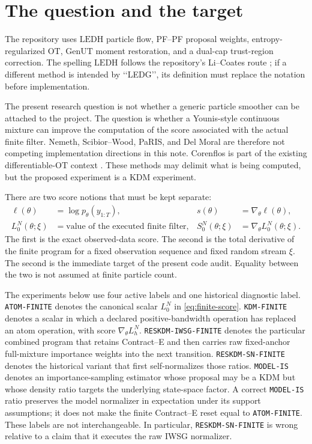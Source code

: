 \documentclass[11pt]{article}
\newcommand{\LEDH}{\ensuremath{\mathrm{LEDH}}}
\newcommand{\GenUT}{\ensuremath{\mathrm{GenUT}}}
\newcommand{\OT}{\ensuremath{\mathrm{OT}}}
\begin{document}
\section{The question and the target}

The repository uses \LEDH{} particle flow, PF--PF proposal weights,
entropy-regularized \OT{}, \GenUT{} moment restoration, and a dual-cap
trust-region correction.  The spelling \LEDH{} follows the repository's
Li--Coates route \citep{li2017particle}; if a different method is intended by
\lq\lq LEDG\rq\rq, its definition must replace the notation before
implementation.

The present research question is not whether a generic particle smoother can
be attached to the project.  The question is whether a Younis-style
continuous mixture can improve the computation of the score associated with
the actual finite filter.  Nemeth, Scibior--Wood, PaRIS, and Del Moral are
therefore not competing implementation directions in this note.  Corenflos
is part of the existing differentiable-\OT{} context
\citep{corenflos2021differentiable}.  These methods may delimit what is being
computed, but the proposed experiment is a KDM experiment.

There are two score notions that must be kept separate:
\begin{align}
  \ell(\theta) &= \log p_\theta(y_{1:T}), &
  s(\theta) &= \nabla_\theta \ell(\theta), \label{eq:exact-score}\\
  L_0^N(\theta;\xi) &= \text{value of the executed finite filter}, &
  S_0^N(\theta;\xi) &= \nabla_\theta L_0^N(\theta;\xi). \label{eq:finite-score}
\end{align}
The first is the exact observed-data score.  The second is the total
derivative of the finite program for a fixed observation sequence and fixed
random stream $\xi$.  The second is the immediate target of the present code
audit.  Equality between the two is not assumed at finite particle count.

The experiments below use four active labels and one historical diagnostic
label.  \texttt{ATOM-FINITE} denotes the
canonical scalar $L_0^N$ in \eqref{eq:finite-score}.  \texttt{KDM-FINITE}
denotes a scalar in which a declared positive-bandwidth operation has replaced
an atom operation, with score $\nabla_\theta L_h^N$.
\texttt{RESKDM-IWSG-FINITE} denotes the particular combined program that
retains Contract--E and then carries raw fixed-anchor full-mixture importance
weights into the next transition.  \texttt{RESKDM-SN-FINITE} denotes the
historical variant that first self-normalizes those ratios.  \texttt{MODEL-IS}
denotes an importance-sampling estimator
whose proposal may be a KDM but whose density ratio targets the underlying
state-space factor.  A correct
\texttt{MODEL-IS} ratio preserves the model normalizer in expectation under
its support assumptions; it does not make the finite Contract--E reset equal
to \texttt{ATOM-FINITE}.  These labels are not interchangeable.  In
particular, \texttt{RESKDM-SN-FINITE} is wrong relative to a claim that it
executes the raw IWSG normalizer.
\end{document}
